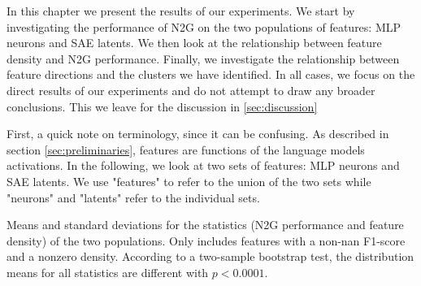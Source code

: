 In this chapter we present the results of our experiments.
We start by investigating the performance of N2G on the two populations of features: MLP neurons and SAE latents.
We then look at the relationship between feature density and N2G performance.
Finally, we investigate the relationship between feature directions and the clusters we have identified.
In all cases, we focus on the direct results of our experiments and do not attempt to draw any broader conclusions.
This we leave for the discussion in \autoref{sec:discussion}

First, a quick note on terminology, since it can be confusing.
As described in section \ref{sec:preliminaries}, features are functions of the language models activations.
In the following, we look at two sets of features: MLP neurons and SAE latents.
We use "features" to refer to the union of the two sets while "neurons" and "latents" refer to the individual sets.



\begin{table}[h]
    \centering
    
    \caption{Means and standard deviations for the statistics (N2G performance and feature density) of the two populations. Only includes features with a non-nan F1-score and a nonzero density. According to a two-sample bootstrap test, the distribution means for all statistics are different with $p<0.0001$.}
    \label{tab:distributions}
\end{table}

